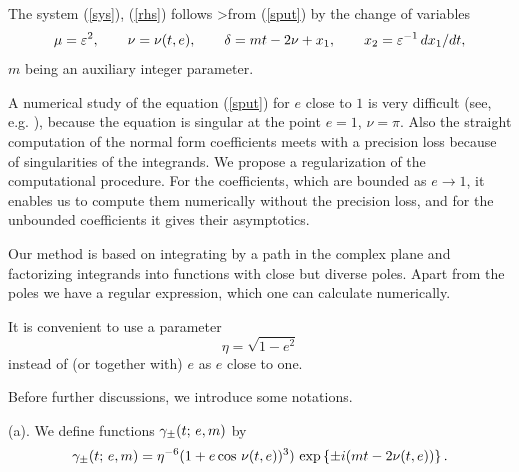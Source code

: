 The system (\ref{sys}), (\ref{rhs}) follows
>from (\ref{sput}) by the change of variables
\cite{ch}
$$
\mu=\varepsilon^2,\qquad\nu=\nu(t,e),\qquad
\delta=mt-2\nu+x_1, \qquad x_2=\varepsilon^{-1}\,dx_1/dt,
$$
$m$ being an auxiliary integer parameter.

A numerical study of the equation (\ref{sput})
for $e$ close to $1$
is very difficult (see, e.g. \cite{sar}),
because the equation is singular at the point
    $e=1$, $\nu=\pi$.
Also the straight computation
of the normal form coefficients meets with a
precision loss because of singularities
of the integrands. We propose a regularization
of the computational procedure. For
the coefficients, which are bounded as $e\to 1$,
it enables us to compute them numerically without
the precision loss, and for the unbounded
coefficients it gives their asymptotics.

Our method is
based on integrating by a path in the complex plane and
factorizing integrands into functions
with close but diverse poles. Apart from the poles
we have a regular expression, which one can calculate
numerically.

It is convenient to use a parameter
$$
\eta=\sqrt{1-e^2}
$$
instead of (or together with) $e$ as $e$ close to one.

\bigskip{}
Before further discussions, we introduce some notations.

\noindent (a).
We define functions $\gamma_{\pm}(t;\,e,m)$  by
\begin{equation}
\label{gpm}
\gamma_{\pm}(t;\,e,m)=
     \eta^{-6}(1+e\cos\,\nu(t,e))^3) \,
     \exp\left\{\pm i(mt-2\nu(t,e))\right\}.
\end{equation}

